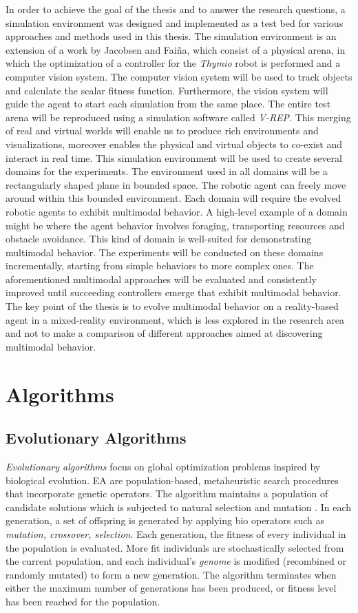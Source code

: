 \documentclass[format=acmsmall, review=false, screen=true]{acmart}
\begin{document}
In order to achieve the goal of the thesis and to answer the research questions, a simulation environment was designed and implemented as a test bed for various approaches and methods used in this thesis. The simulation environment is an extension of a work by Jacobsen and Faiña, which consist of a physical arena, in which the optimization of a controller for the \emph{Thymio} robot is performed and a computer vision system. The computer vision system will be used to track objects and calculate the scalar fitness function. Furthermore, the vision system will guide the agent to start each simulation from the same place. The entire test arena will be reproduced using a simulation software called \emph{V-REP}. This merging of real and virtual worlds will enable us to produce rich environments and visualizations, moreover enables the physical and virtual objects to co-exist and interact in real time. This simulation environment will be used to create several domains for the experiments. The environment used in all domains will be a rectangularly shaped plane in bounded space. The robotic agent can freely move around within this bounded environment. Each domain will require the evolved robotic agents to exhibit multimodal behavior. A high-level example of a domain might be where the agent behavior involves foraging, transporting resources and obstacle avoidance. This kind of domain is well-suited for demonstrating multimodal behavior. The experiments will be conducted on these domains incrementally, starting from simple behaviors to more complex ones. The aforementioned multimodal approaches will be evaluated and consistently improved until succeeding controllers emerge that exhibit multimodal behavior. The key point of the thesis is to evolve multimodal behavior on a reality-based agent in a mixed-reality environment, which is less explored in the research area and not to make a comparison of different approaches aimed at discovering multimodal behavior.

\section{Algorithms}

\subsection{Evolutionary Algorithms}

\emph{Evolutionary algorithms} focus on global optimization problems inspired by biological evolution. EA are population-based, metaheuristic search procedures that incorporate genetic operators. The algorithm maintains a population of candidate solutions which is subjected to natural selection and mutation \cite{back1996evolutionary}. In each generation, a set of offspring is generated by applying bio operators such as \emph{mutation, crossover, selection}. Each generation, the fitness of every individual in the population is evaluated. More fit individuals are stochastically selected from the current population, and each individual's \emph{genome} is modified (recombined or randomly mutated) to form a new generation. The algorithm terminates when either the maximum number of generations has been produced, or fitness level has been reached for the population.
\end{document}

